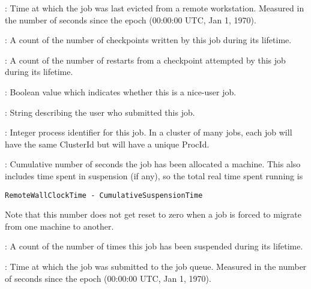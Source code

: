 \begin{description}
\item[\AdAttr{LastVacateTime}] : Time at which the job was last
evicted from a remote workstation.  Measured in the number of seconds
since the epoch (00:00:00 UTC, Jan 1, 1970).

\item[\AdAttr{NumCkpts}] : A count of the number of checkpoints
written by this job during its lifetime.

\item[\AdAttr{NumRestarts}] : A count of the number of restarts from a
checkpoint attempted by this job during its lifetime.

\item[\AdAttr{NiceUser}] : Boolean value which indicates whether
this is a nice-user job.

\item[\AdAttr{Owner}] : String describing the user who submitted this
job.

\item[\AdAttr{ProcId}] : Integer process identifier for this job.  In
a cluster of many jobs, each job will have the same ClusterId but will
have a unique ProcId.

\item[\AdAttr{RemoteWallClockTime}] : Cumulative number of seconds
the job has been allocated a machine.
This also includes time spent in suspension (if any),
so the total real time spent running is 
\begin{verbatim}
RemoteWallClockTime - CumulativeSuspensionTime
\end{verbatim}
Note that this number does not get reset to
zero when a job is forced to migrate from one machine to another.

\item[\AdAttr{TotalSuspensions}] : A count of the number of times this job
has been suspended during its lifetime.

\item[\AdAttr{QDate}] : Time at which the job was submitted to the job
queue.  Measured in the
number of seconds since the epoch (00:00:00 UTC, Jan 1, 1970).


\end{description}
